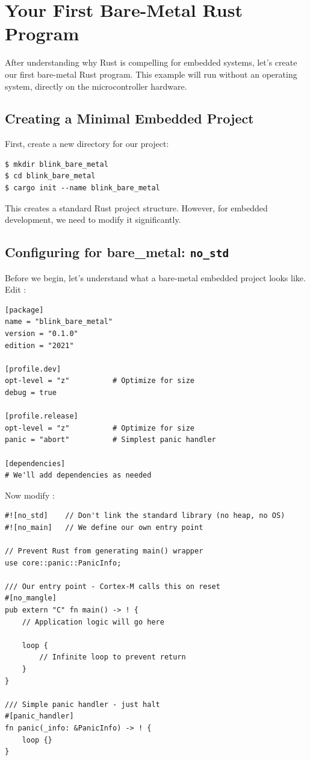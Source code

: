 \section{Your First Bare-Metal Rust Program}
\label{sec:bare-metal-program}


After understanding why Rust is compelling for embedded systems, let's create our first bare-metal Rust program. This example will run without an operating system, directly on the microcontroller hardware.

\subsection{Creating a Minimal Embedded Project}

First, create a new directory for our project:

\begin{verbatim}
$ mkdir blink_bare_metal
$ cd blink_bare_metal
$ cargo init --name blink_bare_metal
\end{verbatim}

This creates a standard Rust project structure. However, for embedded development, we need to modify it significantly.

\subsection{Configuring for bare\_metal: \texttt{no\_std}}

Before we begin, let's understand what a bare-metal embedded project looks like. Edit :

\begin{verbatim}
[package]
name = "blink_bare_metal"
version = "0.1.0"
edition = "2021"

[profile.dev]
opt-level = "z"          # Optimize for size
debug = true

[profile.release]
opt-level = "z"          # Optimize for size
panic = "abort"          # Simplest panic handler

[dependencies]
# We'll add dependencies as needed
\end{verbatim}

Now modify :

\begin{verbatim}
#![no_std]    // Don't link the standard library (no heap, no OS)
#![no_main]   // We define our own entry point

// Prevent Rust from generating main() wrapper
use core::panic::PanicInfo;

/// Our entry point - Cortex-M calls this on reset
#[no_mangle]
pub extern "C" fn main() -> ! {
    // Application logic will go here

    loop {
        // Infinite loop to prevent return
    }
}

/// Simple panic handler - just halt
#[panic_handler]
fn panic(_info: &PanicInfo) -> ! {
    loop {}
}
\end{verbatim}

